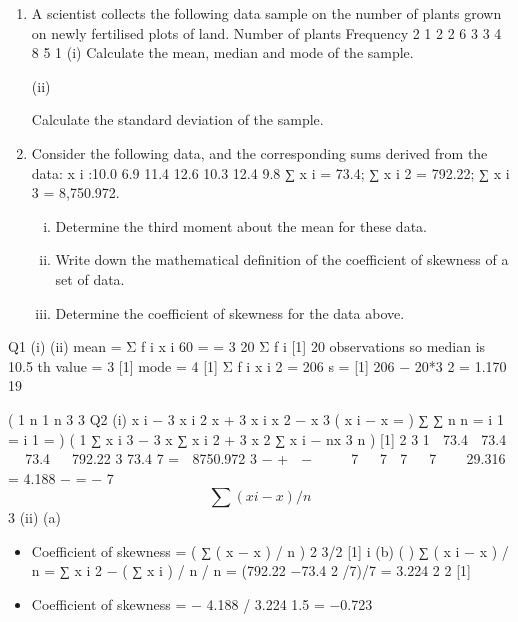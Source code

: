 \documentclass[a4paper,12pt]{article}
\begin{document}
\begin{enumerate}

\item A scientist collects the following data sample on the number of plants grown on
newly fertilised plots of land.
Number of plants Frequency
2
1 2
2 6
3 3
4 8
5 1
(i) Calculate the mean, median and mode of the sample.

(ii)

 Calculate the standard deviation of the sample.

\item 
Consider the following data, and the corresponding sums derived from the data:
x i :10.0 6.9 11.4 12.6 10.3 12.4 9.8
∑ x i = 73.4; ∑ x i 2 = 792.22; ∑ x i 3 = 8,750.972.
\begin{enumerate}[(i)]
\item Determine the third moment about the mean for these data.
\item Write down the mathematical definition of the coefficient of skewness
of a set of data.
\item Determine the coefficient of skewness for the data above. 
\end{enumerate}


\end{enumerate}
\newpage

Q1
(i)
(ii)
mean
=
Σ f i x i 60
= = 3
20
Σ f i
[1]
20 observations so median is 10.5 th value = 3 [1]
mode = 4 [1]
Σ f i x i 2 =
206
s
=
[1]
206 − 20*3 2
= 1.170
19

(
1 n
1 n 3
3
\newpage
Q2 (i)
x i − 3 x i 2 x + 3 x i x 2 − x 3
( x i − x =
)
∑
∑
n
n
= i 1 = i 1
=
)
(
1
∑ x i 3 − 3 x ∑ x i 2 + 3 x 2 ∑ x i − nx 3
n
)
[1]
2
3
1 
73.4
 73.4 
 73.4  
792.22  3
73.4
7
=  8750.972  3
−
+ 
−


 
7  
7
 7 
 7   
29.316
=
    4.188    
−
=
−
7
\[ \sum ( x i − x ) / n \]
3
(ii)
(a)
\begin{itemize}
    \item Coefficient of skewness =
( ∑ ( x − x ) / n )
2
3/2
[1]
i
(b)
(
)
∑ ( x i − x ) / n = ∑ x i 2 − ( ∑ x i ) / n / n = (792.22 −73.4 2 /7)/7 = 3.224
2
2
[1]
\item Coefficient of skewness = − 4.188 / 3.224 1.5 = −0.723
\end{itemize}



\end{document}
